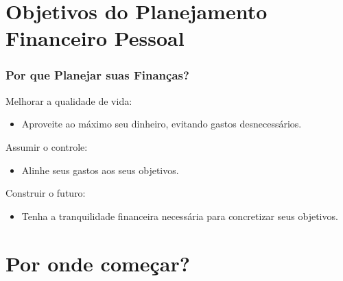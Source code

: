 \section{Objetivos do Planejamento Financeiro Pessoal}


\begin{frame}[t]\frametitle{Por que Planejar suas Finanças?}

  \vspace{1cm}\pause

  \begin{block}{\Large \textcolor{green}{}\quad Melhorar a qualidade de vida:}
    \begin{itemize}
      \item Aproveite ao máximo seu dinheiro, evitando gastos desnecessários.
    \end{itemize}
  \end{block}

  \vspace{0.7cm}\pause

  \begin{block}{\Large \textcolor{blue}{}\quad Assumir o controle:}
    \begin{itemize}
      \item Alinhe seus gastos aos seus objetivos.
    \end{itemize}
  \end{block}

  \vspace{0.7cm}\pause

  \begin{block}{\Large \textcolor{red}{}\quad Construir o futuro:}
    \begin{itemize}
      \item Tenha a tranquilidade financeira necessária para concretizar seus objetivos.
    \end{itemize}
  \end{block}
\end{frame}

\section{Por onde começar?}

